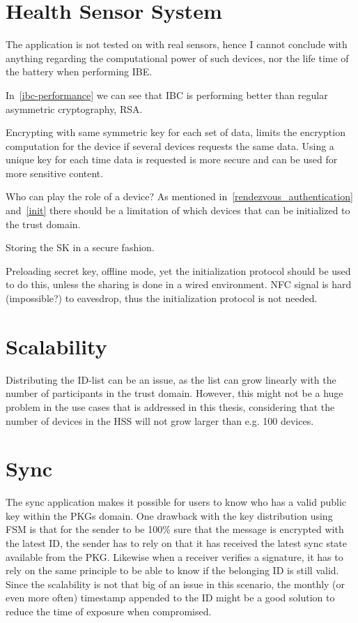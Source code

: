 \section{Health Sensor System}
The application is not tested on with real sensors, hence I cannot conclude with anything regarding the computational power of such devices, nor the life time of the battery when performing \gls{IBE}.  

In~\autoref{ibc-performance} we can see that \gls{IBC} is performing better than regular asymmetric cryptography, RSA. 

Encrypting with same symmetric key for each set of \gls{data}, limits the encryption computation for the device if several devices requests the same \gls{data}.
Using a unique key for each time \gls{data} is requested is more secure and can be used for more sensitive content.

Who can play the role of a device?
As mentioned in~\autoref{rendezvous_authentication} and~\autoref{init} there should be a limitation of which devices that can be initialized to the trust domain.

Storing the \gls{SK} in a secure fashion.

Preloading secret key, offline mode, yet the initialization protocol should be used to do this, unless the sharing is done in a wired environment. 
\gls{NFC} signal is hard (impossible?) to eavesdrop, thus the initialization protocol is not needed. 


\section{Scalability}
Distributing the \gls{ID}-list can be an issue, as the list can grow linearly with the number of participants in the trust domain.
However, this might not be a huge problem in the use cases that is addressed in this thesis, considering that the number of devices in the \gls{HSS} will not grow larger than e.g. 100 devices. 

\section{Sync}
The sync application makes it possible for users to know who has a valid public key within the \gls{PKG}s domain.
One drawback with the key distribution using \gls{FSM} is that for the sender to be 100\% sure that the message is encrypted with the latest \gls{ID}, the sender has to rely on that it has received the latest sync state available from the \gls{PKG}.
Likewise when a \gls{receiver} verifies a signature, it has to rely on the same principle to be able to know if the belonging \gls{ID} is still valid.
Since the scalability is not that big of an issue in this scenario, the monthly (or even more often) timestamp appended to the \gls{ID} might be a good solution to reduce the time of exposure when compromised.

